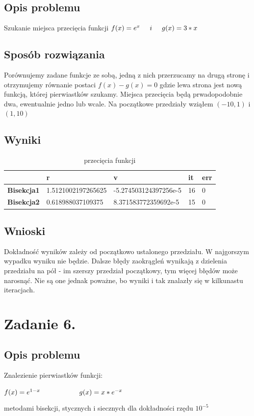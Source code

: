 \documentclass[12pt]{article}
\begin{document}
\subsection{Opis problemu}
Szukanie miejsca przecięcia funkcji $f(x) = e^x \hspace{0.5cm}i\hspace{0.5cm} g(x) = 3*x$
\subsection{Sposób rozwiązania}
Porównujemy zadane funkcje ze sobą, jedną z nich przerzucamy na drugą stronę i otrzymujemy równanie
postaci $f(x) - g(x) = 0$ gdzie lewa strona jest nową funkcją, której pierwiastków szukamy.
Miejsca przecięcia będą prwadopodobnie dwa, ewentualnie jedno lub wcale.
Na początkowe przedziały wziąłem $(-10,1)$ i $(1,10)$
\newpage
\subsection{Wyniki}
\begin{table}[h]
    \caption{przecięcia funkcji}
    \label{pierwiastki}
    \begin{tabular}{|l|l|l|l|l|}
        \hline 
        \textbf{ } & \textbf{r} & \textbf{v } & \textbf{it } & \textbf{err}\\
        \hline
        \textbf{Bisekcja1} & 1.5121002197265625 & -5.274503124397256e-5 & 16 & 0\\
        \hline
        \textbf{Bisekcja2} & 0.618988037109375 & 8.371583772359692e-5 & 15 & 0\\
        \hline
    \end{tabular} 
\end{table}
\subsection{Wnioski}
Dokładność wyników zależy od początkowo ustalonego przedziału. W najgorszym wypadku wyniku nie będzie.
Dalsze błędy zaokrągleń wynikają z dzielenia przedziału na pół - im szerszy przedział początkowy, tym więcej błędów może narosnąć.
Nie są one jednak poważne, bo wyniki i tak znalazły się w kilkunastu iteracjach. 

\section{Zadanie 6.}

\subsection{Opis problemu}
Znalezienie pierwiastków funkcji: 
\begin{center}
    $f(x) = e^{1-x} \hspace*{2cm} g(x) = x * e^{-x}$
\end{center}
metodami bisekcji, stycznych i siecznych dla dokładności rzędu $10^{-5}$
\end{document}
